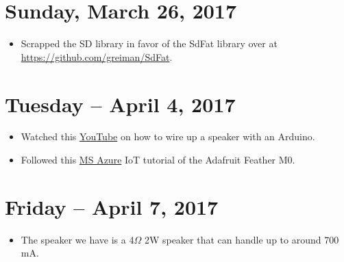 \documentclass[12pt]{article}
\begin{document}
\section{Sunday, March 26, 2017}
\begin{itemize}
\item Scrapped the SD library in favor of the SdFat library over at \url{https://github.com/greiman/SdFat}.
\end{itemize}


\section{Tuesday -- April 4, 2017}
\begin{itemize}
\item Watched this \href{https://www.youtube.com/watch?v=wLlsVXBaQLQ}{YouTube} on how to wire up a speaker with an Arduino.
\item Followed this \href{https://docs.microsoft.com/en-us/azure/iot-hub/iot-hub-adafruit-feather-m0-wifi-kit-arduino-get-started}{MS Azure} IoT tutorial of the Adafruit Feather M0.
\end{itemize}

\section{Friday -- April 7, 2017}
\begin{itemize}
\item The speaker we have is a 4$\Omega$ 2W speaker that can handle up to around 700 mA.
\end{itemize}
\end{document}

